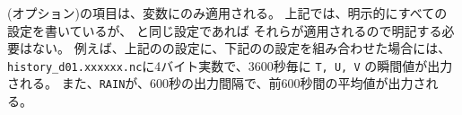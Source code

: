 (オプション)の項目は、変数にのみ適用される。
上記では、明示的にすべての設定を書いているが、
 と同じ設定であれば
それらが適用されるので明記する必要はない。
例えば、上記のの設定に、下記のの設定を組み合わせた場合には、
\verb|history_d01.xxxxxx.nc|に4バイト実数で、3600秒毎に \verb|T, U, V| の瞬間値が出力される。
また、\verb|RAIN|が、600秒の出力間隔で、前600秒間の平均値が出力される。\\

\\

